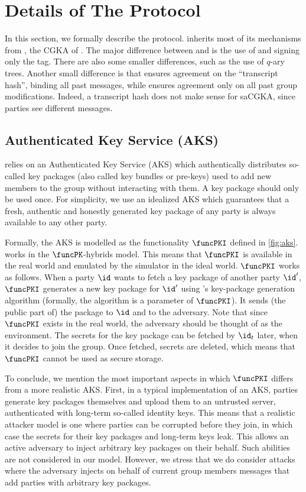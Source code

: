 \section{Details of The \saik Protocol}\label{sec:saik-details}
In this section, we formally describe the \saik protocol. \saik inherits most of its mechanisms from \protITK, the CGKA
of \mls. The major difference between \saik and \protITK is the use of \mmPKE and signing only the tag. There are also
some smaller differences, such as the use of $q$-ary trees. Another small difference is that \protITK ensures agreement on the ``transcript hash'', binding all past messages, while \saik ensures agreement only on all past group modifications. Indeed, a transcript hash does not make sense for saCGKA, since parties see different messages.

\subsection{Authenticated Key Service (AKS)}
\saik relies on an Authenticated Key Service (AKS) which authentically distributes so-called key packages (also called key bundles or pre-keys) used to add new members to the group without interacting with them. A key package should only be used once. For simplicity, we use an idealized AKS which guarantees that a fresh, authentic and honestly generated key package of any party is always available to any other party.

Formally, the AKS is modelled as the functionality $\funcPKI$ defined in \cref{fig:aks}. \saik works in the $\funcPK$-hybrids model. This means that $\funcPKI$ is available in the real world and emulated by the simulator in the ideal world.
$\funcPKI$ works as follows. When a party $\id$ wants to fetch a key package of another party $\id'$, $\funcPKI$ generates a new key package for $\id'$ using \saik's key-package generation algorithm (formally, the algorithm is a parameter of $\funcPKI$). It sends (the public part of) the package to $\id$ and to the adversary. Note that since $\funcPKI$ exists in the real world, the adversary should be thought of as the environment. The secrets for the key package can be fetched by $\id_t$ later, when it decides to join the group. Once fetched, secrets are deleted, which means that $\funcPKI$ cannot be used as secure storage.



To conclude, we mention the most important aspects in which $\funcPKI$ differs from a more realistic AKS. First, in a typical implementation of an AKS, parties generate key packages themselves and upload them to an untrusted server, authenticated with long-term so-called identity keys. This means that a realistic attacker model is one where parties can be corrupted before they join, in which case the secrets for their key packages and long-term keys leak. This allows an active adversary to inject arbitrary key packages on their behalf. Such abilities are not considered in our model. However, we stress that we do consider attacks where the adversary injects on behalf of current group members messages that add parties with arbitrary key packages.

